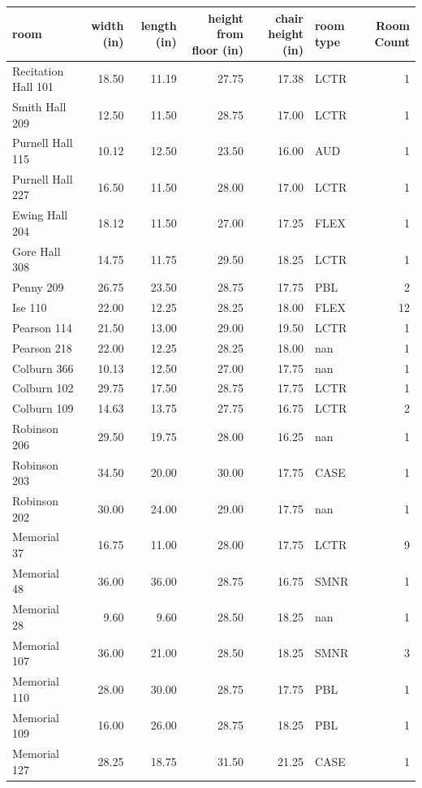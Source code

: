 \documentclass[conference]{IEEEtran}
\begin{document}
\clearpage
\onecolumn
\centering
\begin{tabular}{lrrrrlr}
    \toprule
    room & width (in) & length (in) & height from floor (in) & chair height (in) & room type & Room Count \\
    \midrule
    Recitation Hall 101 & 18.50 & 11.19 & 27.75 & 17.38 & LCTR & 1 \\
    Smith Hall 209 & 12.50 & 11.50 & 28.75 & 17.00 & LCTR & 1 \\
    Purnell Hall 115 & 10.12 & 12.50 & 23.50 & 16.00 & AUD & 1 \\
    Purnell Hall 227 & 16.50 & 11.50 & 28.00 & 17.00 & LCTR & 1 \\
    Ewing Hall 204 & 18.12 & 11.50 & 27.00 & 17.25 & FLEX & 1 \\
    Gore Hall 308 & 14.75 & 11.75 & 29.50 & 18.25 & LCTR & 1 \\
    Penny 209 & 26.75 & 23.50 & 28.75 & 17.75 & PBL & 2 \\
    Ise 110 & 22.00 & 12.25 & 28.25 & 18.00 & FLEX & 12 \\
    Pearson 114 & 21.50 & 13.00 & 29.00 & 19.50 & LCTR & 1 \\
    Pearson 218 & 22.00 & 12.25 & 28.25 & 18.00 & nan & 1 \\
    Colburn 366 & 10.13 & 12.50 & 27.00 & 17.75 & nan & 1 \\
    Colburn 102 & 29.75 & 17.50 & 28.75 & 17.75 & LCTR & 1 \\
    Colburn 109 & 14.63 & 13.75 & 27.75 & 16.75 & LCTR & 2 \\
    Robinson 206 & 29.50 & 19.75 & 28.00 & 16.25 & nan & 1 \\
    Robinson 203 & 34.50 & 20.00 & 30.00 & 17.75 & CASE & 1 \\
    Robinson 202 & 30.00 & 24.00 & 29.00 & 17.75 & nan & 1 \\
    Memorial 37 & 16.75 & 11.00 & 28.00 & 17.75 & LCTR & 9 \\
    Memorial 48 & 36.00 & 36.00 & 28.75 & 16.75 & SMNR & 1 \\
    Memorial 28 & 9.60 & 9.60 & 28.50 & 18.25 & nan & 1 \\
    Memorial 107 & 36.00 & 21.00 & 28.50 & 18.25 & SMNR & 3 \\
    Memorial 110 & 28.00 & 30.00 & 28.75 & 17.75 & PBL & 1 \\
    Memorial 109 & 16.00 & 26.00 & 28.75 & 18.25 & PBL & 1 \\
    Memorial 127 & 28.25 & 18.75 & 31.50 & 21.25 & CASE & 1 \\

\end{tabular}
\end{document}
